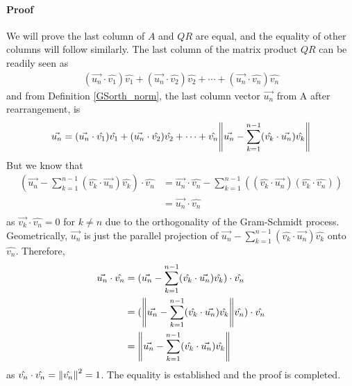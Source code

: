 \begin{proper}
\paragraph{Proof}
We will prove the last column of $A$ and $QR$ are equal, and the equality of other columns will follow similarly. The last column of the matrix product $QR$ can be readily seen as
\begin{align*}
(\vec{u_n} \cdot \hat{v_1}) \hat{v_1} + (\vec{u_n} \cdot \hat{v_2}) \hat{v_2} + \cdots + (\vec{u_n} \cdot \hat{v_n}) \hat{v_n}
\end{align*}
and from Definition \ref{GSorth_norm}, the last column vector $\vec{u_n}$ from A after rearrangement, is
\begin{align*}
\vec{u_n} = (\vec{u_n} \cdot \hat{v_1}) \hat{v_1} + (\vec{u_n} \cdot \hat{v_2}) \hat{v_2} + \cdots + \hat{v_n} \norm{\vec{u_n} - \sum_{k=1}^{n-1}(\hat{v_k} \cdot \vec{u_n})\hat{v_k}}
\end{align*}
But we know that
\begin{align*}
(\vec{u_n} - \sum_{k=1}^{n-1}(\hat{v_k} \cdot \vec{u_n})\hat{v_k}) \cdot \hat{v_n} &= \vec{u_n} \cdot \hat{v_n} - \sum_{k=1}^{n-1}((\hat{v_k} \cdot \vec{u_n})(\hat{v_k} \cdot \hat{v_n}))\\
&= \vec{u_n} \cdot \hat{v_n} \\
\end{align*}
as $\vec{v_k} \cdot \hat{v_n} = 0$ for $k \neq n$ due to the orthogonality of the Gram-Schmidt process. Geometrically, $\vec{u_n}$ is just the parallel projection of $\vec{u_n} - \sum_{k=1}^{n-1}(\hat{v_k} \cdot \vec{u_n})\hat{v_k}$ onto $\hat{v_n}$. Therefore, 
\begin{align*}
\vec{u_n} \cdot \hat{v_n} &= (\vec{u_n} - \sum_{k=1}^{n-1}(\hat{v_k} \cdot \vec{u_n})\hat{v_k}) \cdot \hat{v_n} \\
&= (\norm{\vec{u_n} - \sum_{k=1}^{n-1}(\hat{v_k} \cdot \vec{u_n})\hat{v_k}} \hat{v_n}) \cdot \hat{v_n} \\
&= \norm{\vec{u_n} - \sum_{k=1}^{n-1}(\hat{v_k} \cdot \vec{u_n})\hat{v_k}} 
\end{align*}
as $\hat{v_n} \cdot \hat{v_n} = \norm{\hat{v_n}}^2 = 1$. The equality is established and the proof is completed.
\end{proper}

